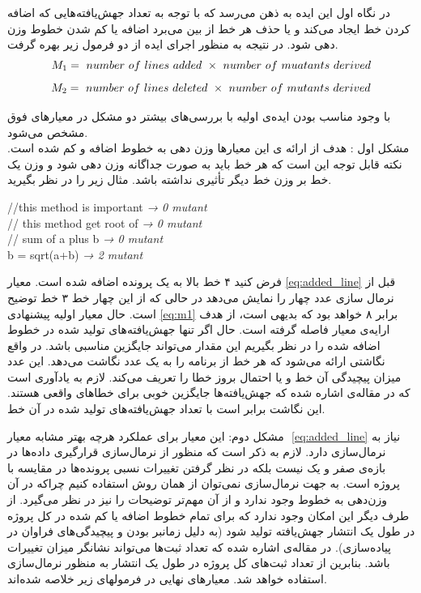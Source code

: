 در نگاه اول  این ایده به ذهن می‌رسد که با توجه به تعداد جهش‌یافته‌هایی که  اضافه   کردن  خط ایجاد می‌کند و یا حذف هر خط  از بین می‌برد اضافه یا کم شدن خطوط وزن دهی شود. در نتیجه به منظور اجرای ایده از دو  فرمول زیر بهره گرفت.\\
\begin{equation}	 \label{eq:m1}
M_1 =\ number\ of\ lines\ added\ \times \ number\ of\ muatants\ derived\\
\end{equation}
\begin{equation}
M_2 =\ number\ of\ lines\ deleted\ \times \ number\ of\ mutants\ derived\\
\end{equation}


با وجود مناسب بودن ایده‌ی اولیه با بررسی‌های بیشتر دو مشکل در معیارهای فوق مشخص می‌شود.\\
مشکل اول : هدف از ارائه ی این معیارها وزن دهی به خطوط اضافه و کم شده است. نکته قابل توجه این است که هر خط باید به صورت جداگانه وزن دهی شود و وزن یک خط بر وزن خط دیگر تأثیری نداشته باشد. مثال زیر را در نظر بگیرید.
\begin{latin}
\flushleft
//this method is important  \emph{→ 0 mutant} \\
// this method get root of \emph{→ 0 mutant}\\
// sum of a plus b \emph{→ 0 mutant} \\ 
b = sqrt(a+b) \emph{→ 2 mutant} \\
\end{latin}

فرض کنید ۴ خط بالا به یک پرونده اضافه شده است. معیار   \ref{eq:added_line} قبل از نرمال سازی عدد چهار را نمایش می‌دهد در حالی که از این چهار خط ۳ خط توضیح است. حال معیار اولیه پیشنهادی \ref{eq:m1} برابر ۸ خواهد بود که بدیهی است، از هدف ارايه‌ی معیار فاصله گرفته است. حال اگر تنها جهش‌یافته‌های تولید شده در خطوط اضافه شده را در نظر بگیریم این مقدار می‌تواند جایگزین مناسبی باشد. در‌ واقع نگاشتی  ارائه می‌شود که هر خط از برنامه را به یک عدد نگاشت می‌دهد. این عدد میزان پیچیدگی آن خط و یا احتمال بروز خطا را تعریف می‌کند.  لازم به یادآوری است که در مقاله‌ی  \cite{just2014mutants} اشاره شده که جهش‌یافته‌ها جایگزین خوبی برای خطاهای واقعی هستند. این نگاشت برابر است با تعداد جهش‌یافته‌های تولید شده در آن خط.

مشکل دوم: این معیار برای عملکرد هرچه بهتر مشابه معیار  ‌   \ref{eq:added_line} نیاز به نرمال‌سازی دارد. لازم به ذکر است که منظور از نرمال‌سازی قرارگیری داده‌ها در بازه‌ی صفر و یک نیست بلکه  در نظر گرفتن تغییرات  نسبی پرونده‌ها  در مقایسه با پروژه است. به جهت نرمال‌سازی نمی‌توان از همان روش استفاده کنیم چراکه در آن وزن‌دهی به خطوط وجود ندارد و از آن مهم‌تر توضیحات را نیز در نظر می‌گیرد. از طرف دیگر این امکان وجود ندارد که برای تمام خطوط اضافه یا کم شده در کل پروژه در طول یک انتشار جهش‌یافته تولید شود (به دلیل زمانبر بودن و پیچیدگی‌های فراوان در پیاده‌سازی). در مقاله‌ی \cite{bird2011don} اشاره شده که تعداد ثبت‌ها می‌تواند نشانگر میزان تغییرات باشد. بنابرین از تعداد ثبت‌های کل پروژه در طول یک انتشار به منظور نرمال‌سازی استفاده خواهد شد. معیارهای نهایی در فرمولهای زیر خلاصه شده‌اند.\\

